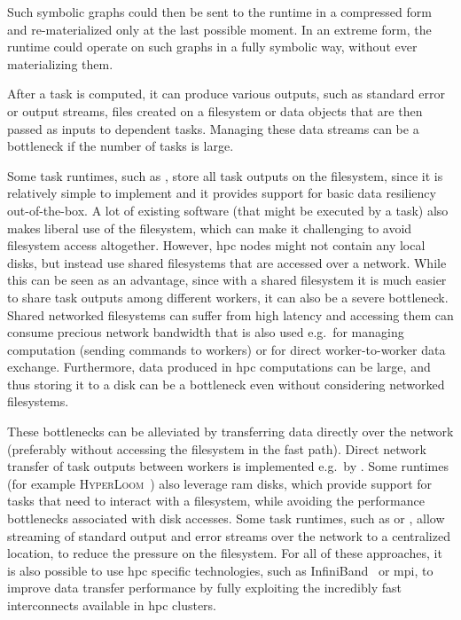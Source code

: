 \begin{description}[wide=0pt]
		Such symbolic graphs could then be sent to the runtime in a compressed form and re-materialized
		only at the last possible moment. In an extreme form, the runtime could operate on such graphs in a
		fully symbolic way, without ever materializing them.
	\item[Data transfers] After a task is computed, it can produce various outputs, such as standard error or output streams,
		files created on a filesystem or data objects that are then passed as inputs to dependent tasks.
		Managing these data streams can be a bottleneck if the number of tasks is large.

		Some task runtimes, such as \snakemake{}, store all task outputs on the filesystem, since
		it is relatively simple to implement and it provides support for basic data resiliency
		out-of-the-box. A lot of existing software (that might be executed by a task) also makes liberal
		use of the filesystem, which can make it challenging to avoid filesystem access altogether.
		However, \gls{hpc} nodes might not contain any local disks, but instead use shared
		filesystems that are accessed over a network. While this can be seen as an advantage, since with a
		shared filesystem it is much easier to share task outputs among different workers, it can also be a
		severe bottleneck. Shared networked filesystems can suffer from high latency and accessing them can
		consume precious network bandwidth that is also used e.g.\ for managing computation (sending
		commands to workers) or for direct worker-to-worker data exchange. Furthermore, data produced in
		\gls{hpc} computations can be large, and thus storing it to a disk can be a bottleneck
		even without considering networked filesystems.

		These bottlenecks can be alleviated by transferring data directly over the network (preferably
		without accessing the filesystem in the fast path). Direct network transfer of task outputs between
		workers is implemented e.g.\ by \dask{}. Some runtimes (for example
		\textsc{HyperLoom}~\cite{hyperloom}) also leverage \gls{ram} disks, which
		provide support for tasks that need to interact with a filesystem, while avoiding the performance
		bottlenecks associated with disk accesses. Some task runtimes, such as \hypershell{} or
		\pegasus{}, allow streaming of standard output and error streams over the network to a
		centralized location, to reduce the pressure on the filesystem. For all of these approaches, it is
		also possible to use \gls{hpc} specific technologies, such as
		InfiniBand~\cite{infiniband} or \gls{mpi}, to improve data transfer performance
		by fully exploiting the incredibly fast interconnects available in \gls{hpc} clusters.
\end{description}

